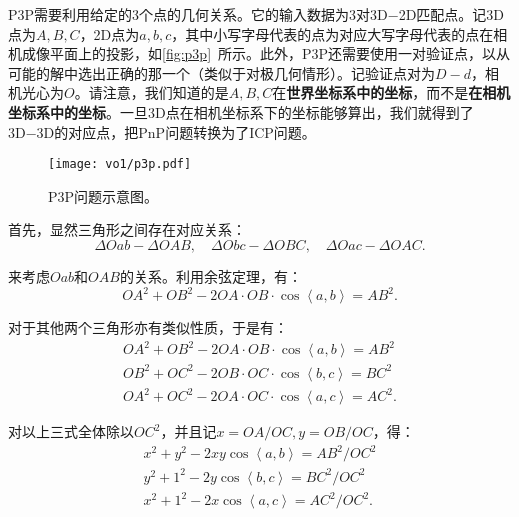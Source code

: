 P3P需要利用给定的3个点的几何关系。它的输入数据为3对3D−2D匹配点。记3D点为$A, B, C$，2D点为$a,b,c$，其中小写字母代表的点为对应大写字母代表的点在相机成像平面上的投影，如\autoref{fig:p3p}~所示。此外，P3P还需要使用一对验证点，以从可能的解中选出正确的那一个（类似于对极几何情形）。记验证点对为$D-d$，相机光心为$O$。请注意，我们知道的是$A,B,C$在\textbf{世界坐标系中的坐标}，而不是\textbf{在相机坐标系中的坐标}。一旦3D点在相机坐标系下的坐标能够算出，我们就得到了3D−3D的对应点，把PnP问题转换为了ICP问题。

\begin{figure}[!ht]
	\centering
	\texttt{[image: vo1/p3p.pdf]}
	\caption{P3P问题示意图。}
	\label{fig:p3p}
\end{figure}

首先，显然三角形之间存在对应关系：
\begin{equation}
\Delta Oab - \Delta OAB, \quad \Delta Obc - \Delta OBC, \quad \Delta Oac - \Delta OAC.
\end{equation}

来考虑$Oab$和$OAB$的关系。利用余弦定理，有：
\begin{equation}
O{A^2} + O{B^2} - 2OA \cdot OB \cdot \cos \left\langle a,b \right \rangle  = A{B^2}.
\end{equation}

对于其他两个三角形亦有类似性质，于是有：
\begin{equation}
\begin{array}{l}
O{A^2} + O{B^2} - 2OA \cdot OB \cdot \cos \left\langle a,b \right \rangle  = A{B^2}\\
O{B^2} + O{C^2} - 2OB \cdot OC \cdot \cos \left\langle b,c \right \rangle  = B{C^2}\\
O{A^2} + O{C^2} - 2OA \cdot OC \cdot \cos \left\langle a,c \right \rangle  = A{C^2}.
\end{array}
\end{equation}

对以上三式全体除以$OC^2$，并且记$x=OA/OC, y=OB/OC$，得：
\begin{equation}
\begin{array}{l}
{x^2} + {y^2} - 2xy\cos \left\langle a,b \right \rangle  = A{B^2}/O{C^2}\\
{y^2} + {1^2} - 2y\cos \left\langle b,c \right \rangle  = B{C^2}/O{C^2}\\
{x^2} + {1^2} - 2x\cos \left\langle a,c \right \rangle  = A{C^2}/O{C^2}.
\end{array}
\end{equation}


